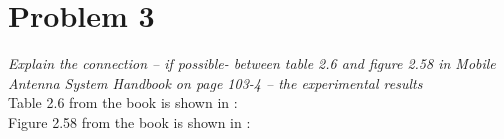 \section{Problem 3}
\textit{Explain the connection – if possible- between table 2.6 and figure 2.58 in Mobile Antenna System Handbook on page 103-4 – the experimental results}\\

Table 2.6 from the book is shown in :
\\

Figure 2.58 from the book is shown in :
